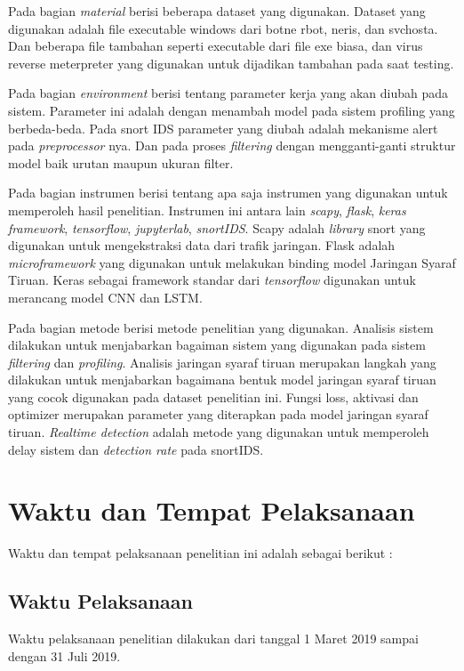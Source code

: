 \documentclass[./skripsi.tex]{subfiles}
\begin{document}
\par Pada bagian \textit{material} berisi beberapa dataset yang digunakan. Dataset yang digunakan adalah file executable windows dari botne rbot, neris, dan svchosta. Dan beberapa file tambahan seperti executable dari file exe biasa, dan virus reverse meterpreter yang digunakan untuk dijadikan tambahan pada saat testing.
\par Pada bagian \textit{environment} berisi tentang parameter kerja yang akan diubah pada sistem. Parameter ini adalah dengan menambah model pada sistem profiling yang berbeda-beda. Pada snort IDS parameter yang diubah adalah mekanisme alert pada \textit{preprocessor} nya. Dan pada proses \textit{filtering} dengan mengganti-ganti struktur model baik urutan maupun ukuran filter.
\par Pada bagian instrumen berisi tentang apa saja instrumen yang digunakan untuk memperoleh hasil penelitian. Instrumen ini antara lain \textit{scapy}, \textit{flask}, \textit{keras framework}, \textit{tensorflow}, \textit{jupyterlab}, \textit{snortIDS}. Scapy adalah \textit{library} snort yang digunakan untuk mengekstraksi data dari trafik jaringan. Flask adalah \textit{microframework} yang digunakan untuk melakukan binding model Jaringan Syaraf Tiruan. Keras sebagai framework standar dari \textit{tensorflow} digunakan untuk merancang model CNN dan LSTM.
\par Pada bagian metode berisi metode penelitian yang digunakan. Analisis sistem dilakukan untuk menjabarkan bagaiman sistem yang digunakan pada sistem \textit{filtering} dan \textit{profiling}. Analisis jaringan syaraf tiruan merupakan langkah yang dilakukan untuk menjabarkan bagaimana bentuk model jaringan syaraf tiruan yang cocok digunakan pada dataset penelitian ini. Fungsi loss, aktivasi dan optimizer merupakan parameter yang diterapkan pada model jaringan syaraf tiruan. \textit{Realtime detection} adalah metode yang digunakan untuk memperoleh delay sistem dan \textit{detection rate} pada snortIDS.
\section{Waktu dan Tempat Pelaksanaan}
\par Waktu dan tempat pelaksanaan penelitian ini adalah sebagai berikut :
\subsection{Waktu Pelaksanaan}
\par Waktu pelaksanaan penelitian dilakukan dari tanggal 1 Maret 2019 sampai dengan 31 Juli 2019.
\end{document}
